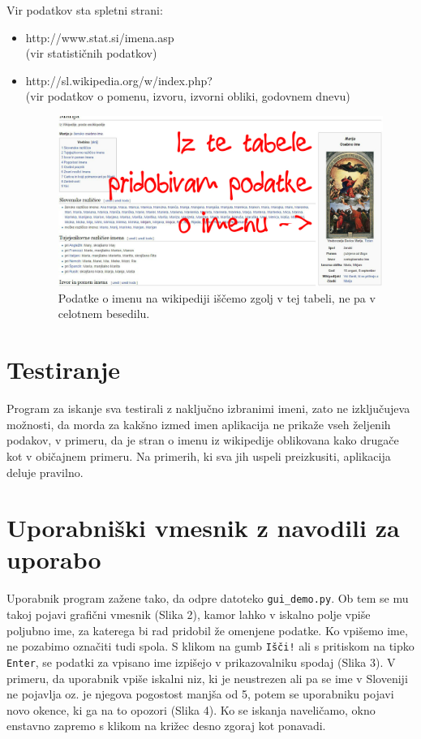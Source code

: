 \documentclass[a4paper, 12pt]{article}
\begin{document}
Vir podatkov sta spletni strani:
\begin{itemize}
\item http://www.stat.si/imena.asp\\
(vir statističnih podatkov)
\item http://sl.wikipedia.org/w/index.php?\\
(vir podatkov o pomenu, izvoru, izvorni obliki, godovnem dnevu)

\begin{figure}[h]
\centering
\includegraphics[scale=0.25] {wiki.jpg}
\caption{Podatke o imenu na wikipediji iščemo zgolj v tej tabeli, ne pa v celotnem besedilu.}
\end{figure}

\end{itemize}

\section{Testiranje}
Program za iskanje sva testirali z naključno izbranimi imeni, zato ne izključujeva možnosti, da morda za kakšno izmed imen aplikacija ne prikaže vseh željenih podakov, v primeru, da je stran o imenu iz wikipedije oblikovana kako drugače kot v običajnem primeru. Na primerih, ki sva jih uspeli preizkusiti, aplikacija deluje pravilno.

\section{Uporabniški vmesnik z navodili za uporabo}

Uporabnik program zažene tako, da odpre datoteko \texttt{gui\_demo.py}. Ob tem se mu takoj pojavi grafični vmesnik (Slika 2), kamor lahko v iskalno polje vpiše poljubno ime, za katerega bi rad pridobil že omenjene podatke. Ko vpišemo ime, ne pozabimo označiti tudi spola. S klikom na gumb \texttt{Išči!} ali s pritiskom na tipko \texttt{Enter}, se podatki za vpisano ime izpišejo v prikazovalniku spodaj (Slika 3). V primeru, da uporabnik vpiše iskalni niz, ki je neustrezen ali pa se ime v Sloveniji ne pojavlja oz. je njegova pogostost manjša od 5, potem se uporabniku pojavi novo okence, ki ga na to opozori (Slika 4). Ko se iskanja naveličamo, okno enstavno zapremo s klikom na križec desno zgoraj kot ponavadi.
\end{document}
